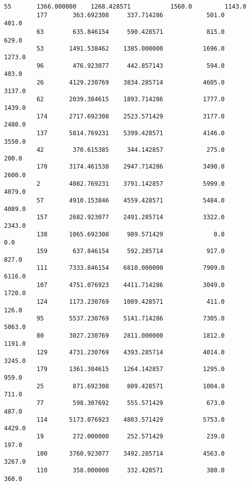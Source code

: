 \documentclass[11pt]{article}
\begin{document}
\begin{Verbatim}[commandchars=\\\{\}]
         55       1366.000000    1268.428571           1560.0         1143.0   
         177       363.692308     337.714286            501.0          401.0   
         63        635.846154     590.428571            815.0          629.0   
         53       1491.538462    1385.000000           1696.0         1273.0   
         96        476.923077     442.857143            594.0          403.0   
         26       4129.230769    3834.285714           4605.0         3137.0   
         62       2039.384615    1893.714286           1777.0         1439.0   
         174      2717.692308    2523.571429           3177.0         2480.0   
         137      5814.769231    5399.428571           4146.0         3550.0   
         42        370.615385     344.142857            275.0          200.0   
         170      3174.461538    2947.714286           3490.0         2600.0   
         2        4082.769231    3791.142857           5999.0         4079.0   
         57       4910.153846    4559.428571           5484.0         4089.0   
         157      2682.923077    2491.285714           3322.0         2343.0   
         138      1065.692308     989.571429              0.0            0.0   
         159       637.846154     592.285714            917.0          827.0   
         111      7333.846154    6810.000000           7909.0         6116.0   
         107      4751.076923    4411.714286           3049.0         1720.0   
         124      1173.230769    1089.428571            411.0          126.0   
         95       5537.230769    5141.714286           7305.0         5063.0   
         80       3027.230769    2811.000000           1812.0         1191.0   
         129      4731.230769    4393.285714           4014.0         3245.0   
         179      1361.384615    1264.142857           1295.0          959.0   
         25        871.692308     809.428571           1004.0          711.0   
         77        598.307692     555.571429            673.0          487.0   
         114      5173.076923    4803.571429           5753.0         4429.0   
         19        272.000000     252.571429            239.0          197.0   
         100      3760.923077    3492.285714           4563.0         3267.0   
         110       358.000000     332.428571            380.0          360.0   
         

\end{Verbatim}
\end{document}
